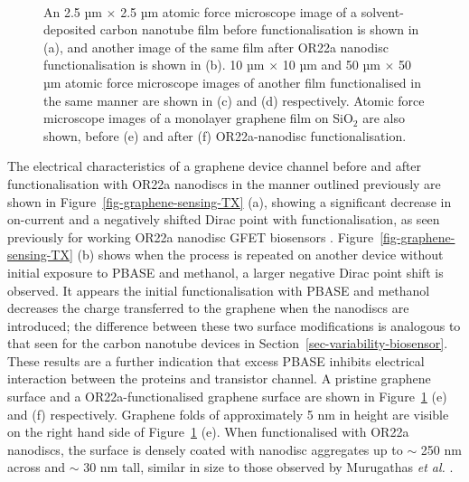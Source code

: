 \documentclass[
  a4paper,
]{scrbook}
\begin{document}
\begin{figure}
\begin{minipage}[t]{0.01\linewidth}
{\centering 

~

}

\end{minipage}%

\caption{\label{fig-solvent-deposited-AFM-comparison}An 2.5 µm
\(\times\) 2.5 µm atomic force microscope image of a solvent-deposited
carbon nanotube film before functionalisation is shown in (a), and
another image of the same film after OR22a nanodisc functionalisation is
shown in (b). 10 µm \(\times\) 10 µm and 50 µm \(\times\) 50 µm atomic
force microscope images of another film functionalised in the same
manner are shown in (c) and (d) respectively. Atomic force microscope
images of a monolayer graphene film on SiO\(_2\) are also shown, before
(e) and after (f) OR22a-nanodisc functionalisation.}

\end{figure}

The electrical characteristics of a graphene device channel before and
after functionalisation with OR22a nanodiscs in the manner outlined
previously are shown in Figure~\ref{fig-graphene-sensing-TX} (a),
showing a significant decrease in on-current and a negatively shifted
Dirac point with functionalisation, as seen previously for working OR22a
nanodisc GFET biosensors \autocite{Murugathas2020}.
Figure~\ref{fig-graphene-sensing-TX} (b) shows when the process is
repeated on another device without initial exposure to PBASE and
methanol, a larger negative Dirac point shift is observed. It appears
the initial functionalisation with PBASE and methanol decreases the
charge transferred to the graphene when the nanodiscs are introduced;
the difference between these two surface modifications is analogous to
that seen for the carbon nanotube devices in
Section~\ref{sec-variability-biosensor}. These results are a further
indication that excess PBASE inhibits electrical interaction between the
proteins and transistor channel. A pristine graphene surface and a
OR22a-functionalised graphene surface are shown in
Figure~\ref{fig-solvent-deposited-AFM-comparison} (e) and (f)
respectively. Graphene folds of approximately 5 nm in height are visible
on the right hand side of
Figure~\ref{fig-solvent-deposited-AFM-comparison} (e). When
functionalised with OR22a nanodiscs, the surface is densely coated with
nanodisc aggregates up to \(\sim\) 250 nm across and \(\sim\) 30 nm
tall, similar in size to those observed by Murugathas \emph{et al.}
\autocite{Murugathas2020}.
\end{document}
